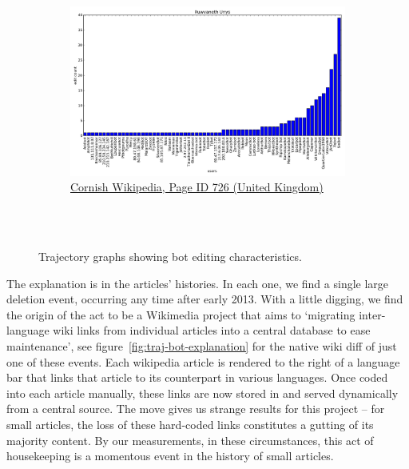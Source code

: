 \begin{figure}
{\begin{subfigure}[b!]{1.2\linewidth}
      \includegraphics[width=0.45\linewidth]{img/traj-bot/kw736users.png}
      \caption{\href{http://kw.wikipedia.org/wiki/index.php?curid=736}{Cornish
          Wikipedia, Page ID 726 (United Kingdom)}}
    \end{subfigure}
  }\\
  \vspace{5mm}
  \\
  \caption{Trajectory graphs showing bot editing characteristics.}
  \label{fig:traj-bot}
\end{figure}

The explanation is in the articles' histories. In each one, we find a
single large deletion event, occurring any time after early 2013. With
a little digging, we find the origin of the act to be a Wikimedia
project that aims to `migrating inter-language wiki links from
individual articles into a central database to ease
maintenance',\cite{wiki-interwikilinks} see
figure~\ref{fig:traj-bot-explanation} for the native wiki diff of just
one of these events. Each wikipedia article is rendered to the right
of a language bar that links that article to its counterpart in
various languages. Once coded into each article manually, these links
are now stored in and served dynamically from a central
source.\cite{wiki-blog-onwikidata} The move gives us strange results
for this project -- for small articles, the loss of these hard-coded
links constitutes a gutting of its majority content. By our
measurements, in these circumstances, this act of housekeeping is a
momentous event in the history of small articles.

